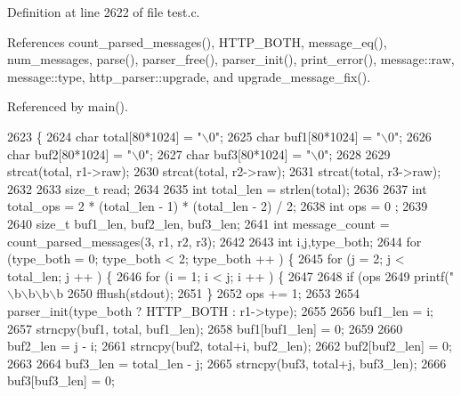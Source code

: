 Definition at line 2622 of file test.\+c.



References count\+\_\+parsed\+\_\+messages(), H\+T\+T\+P\+\_\+\+B\+O\+TH, message\+\_\+eq(), num\+\_\+messages, parse(), parser\+\_\+free(), parser\+\_\+init(), print\+\_\+error(), message\+::raw, message\+::type, http\+\_\+parser\+::upgrade, and upgrade\+\_\+message\+\_\+fix().



Referenced by main().


\begin{DoxyCode}
2623 \{
2624   \textcolor{keywordtype}{char} total[80*1024] = \textcolor{stringliteral}{"\(\backslash\)0"};
2625   \textcolor{keywordtype}{char} buf1[80*1024] = \textcolor{stringliteral}{"\(\backslash\)0"};
2626   \textcolor{keywordtype}{char} buf2[80*1024] = \textcolor{stringliteral}{"\(\backslash\)0"};
2627   \textcolor{keywordtype}{char} buf3[80*1024] = \textcolor{stringliteral}{"\(\backslash\)0"};
2628 
2629   strcat(total, r1->raw);
2630   strcat(total, r2->raw);
2631   strcat(total, r3->raw);
2632 
2633   \textcolor{keywordtype}{size\_t} read;
2634 
2635   \textcolor{keywordtype}{int} total\_len = strlen(total);
2636 
2637   \textcolor{keywordtype}{int} total\_ops = 2 * (total\_len - 1) * (total\_len - 2) / 2;
2638   \textcolor{keywordtype}{int} ops = 0 ;
2639 
2640   \textcolor{keywordtype}{size\_t} buf1\_len, buf2\_len, buf3\_len;
2641   \textcolor{keywordtype}{int} message\_count = count_parsed_messages(3, r1, r2, r3);
2642 
2643   \textcolor{keywordtype}{int} i,j,type\_both;
2644   \textcolor{keywordflow}{for} (type\_both = 0; type\_both < 2; type\_both ++ ) \{
2645     \textcolor{keywordflow}{for} (j = 2; j < total\_len; j ++ ) \{
2646       \textcolor{keywordflow}{for} (i = 1; i < j; i ++ ) \{
2647 
2648         \textcolor{keywordflow}{if} (ops %
2649           printf(\textcolor{stringliteral}{"\(\backslash\)b\(\backslash\)b\(\backslash\)b\(\backslash\)b%
2650           fflush(stdout);
2651         \}
2652         ops += 1;
2653 
2654         parser_init(type\_both ? HTTP_BOTH : r1->type);
2655 
2656         buf1\_len = i;
2657         strncpy(buf1, total, buf1\_len);
2658         buf1[buf1\_len] = 0;
2659 
2660         buf2\_len = j - i;
2661         strncpy(buf2, total+i, buf2\_len);
2662         buf2[buf2\_len] = 0;
2663 
2664         buf3\_len = total\_len - j;
2665         strncpy(buf3, total+j, buf3\_len);
2666         buf3[buf3\_len] = 0;
}
\end{DoxyCode}
